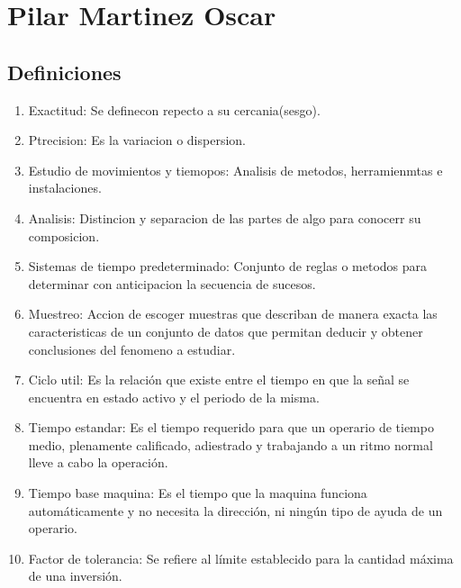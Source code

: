 \section{Pilar Martinez Oscar}
\subsection{Definiciones}

\begin{enumerate}
    \item Exactitud: 
    Se definecon repecto a su cercania(sesgo).
    \item Ptrecision: 
    Es la variacion o dispersion.
    \item Estudio de movimientos y tiemopos:
    Analisis de metodos, herramienmtas e instalaciones. 
    \item Analisis: 
    Distincion y separacion de las partes de algo para conocerr su composicion. 
    \item Sistemas de tiempo predeterminado: 
    Conjunto de reglas o metodos para determinar con anticipacion la secuencia de sucesos.
    \item Muestreo: 
    Accion de escoger muestras que describan de manera exacta las caracteristicas de un  conjunto de datos que permitan deducir y obtener conclusiones del fenomeno a estudiar.
    \item Ciclo util: 
    Es la relación que existe entre el tiempo en que la señal se encuentra en estado activo y el periodo de la misma.
    \item Tiempo estandar: 
    Es el tiempo requerido para que un operario de tiempo medio, plenamente calificado, adiestrado y trabajando a un ritmo normal lleve a cabo la operación.
    \item Tiempo base maquina: 
    Es el tiempo que la maquina funciona automáticamente y no necesita la dirección, ni ningún tipo de ayuda de un operario.
    \item Factor de tolerancia: 
    Se refiere al límite establecido para la cantidad máxima de una inversión.

    
\end{enumerate}